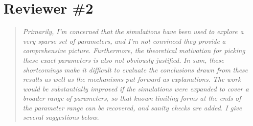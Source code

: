 \documentclass[11pt]{article}
\newenvironment{reviewerquote}{\begin{quote}\color{black}\itshape}{\end{quote}}
\begin{document}
\section*{Reviewer \#2}

\begin{reviewerquote}
Primarily, I’m concerned that the simulations have been used to explore a very sparse set of parameters, and I’m not convinced they provide a comprehensive picture. Furthermore, the theoretical motivation for picking these exact parameters is also not obviously justified. In sum, these shortcomings make it difficult to evaluate the conclusions drawn from these results as well as the mechanisms put forward as explanations. The work would be substantially improved if the simulations were expanded to cover a broader range of parameters, so that known limiting forms at the ends of the parameter range can be recovered, and sanity checks are added. I give several suggestions below.
\end{reviewerquote}
\end{document}
